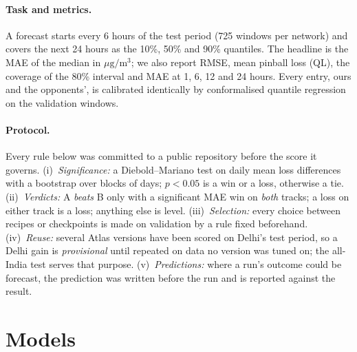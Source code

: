 \documentclass{article}
\newcommand{\pmu}{\ensuremath{\mu\mathrm{g/m^3}}}
\begin{document}
\paragraph{Task and metrics.} A forecast starts every 6 hours of the test period (725 windows per network) and covers
the next 24 hours as the 10\%, 50\% and 90\% quantiles. The headline is the MAE of the median in \pmu; we also report
RMSE, mean pinball loss (QL), the coverage of the 80\% interval and MAE at 1, 6, 12 and 24 hours. Every entry, ours and
the opponents', is calibrated identically by conformalised quantile regression on the validation windows.

\paragraph{Protocol.} Every rule below was committed to a public repository before the score it governs.
(i)~\emph{Significance:} a Diebold--Mariano test on daily mean loss differences with a bootstrap over blocks of days;
$p<0.05$ is a win or a loss, otherwise a tie. (ii)~\emph{Verdicts:} A \emph{beats} B only with a significant MAE win on
\emph{both} tracks; a loss on either track is a loss; anything else is level. (iii)~\emph{Selection:} every choice
between recipes or checkpoints is made on validation by a rule fixed beforehand. (iv)~\emph{Reuse:} several Atlas
versions have been scored on Delhi's test period, so a Delhi gain is \emph{provisional} until repeated on data no
version was tuned on; the all-India test serves that purpose. (v)~\emph{Predictions:} where a run's outcome could be
forecast, the prediction was written before the run and is reported against the result.

\section{Models}
\label{sec:models}
\end{document}
